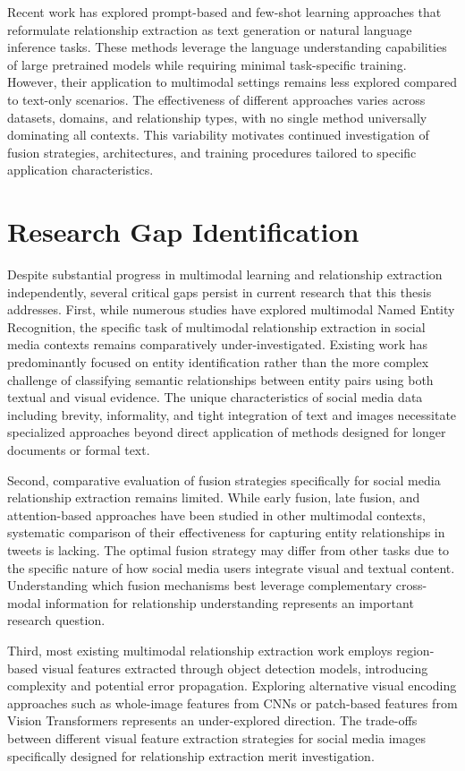 \documentclass[12pt,a4paper]{report}
\begin{document}
Recent work has explored prompt-based and few-shot learning approaches that reformulate relationship extraction as text generation or natural language inference tasks. These methods leverage the language understanding capabilities of large pretrained models while requiring minimal task-specific training. However, their application to multimodal settings remains less explored compared to text-only scenarios. The effectiveness of different approaches varies across datasets, domains, and relationship types, with no single method universally dominating all contexts. This variability motivates continued investigation of fusion strategies, architectures, and training procedures tailored to specific application characteristics.

\section{Research Gap Identification}

Despite substantial progress in multimodal learning and relationship extraction independently, several critical gaps persist in current research that this thesis addresses. First, while numerous studies have explored multimodal Named Entity Recognition, the specific task of multimodal relationship extraction in social media contexts remains comparatively under-investigated. Existing work has predominantly focused on entity identification rather than the more complex challenge of classifying semantic relationships between entity pairs using both textual and visual evidence. The unique characteristics of social media data including brevity, informality, and tight integration of text and images necessitate specialized approaches beyond direct application of methods designed for longer documents or formal text.

Second, comparative evaluation of fusion strategies specifically for social media relationship extraction remains limited. While early fusion, late fusion, and attention-based approaches have been studied in other multimodal contexts, systematic comparison of their effectiveness for capturing entity relationships in tweets is lacking. The optimal fusion strategy may differ from other tasks due to the specific nature of how social media users integrate visual and textual content. Understanding which fusion mechanisms best leverage complementary cross-modal information for relationship understanding represents an important research question.

Third, most existing multimodal relationship extraction work employs region-based visual features extracted through object detection models, introducing complexity and potential error propagation. Exploring alternative visual encoding approaches such as whole-image features from CNNs or patch-based features from Vision Transformers represents an under-explored direction. The trade-offs between different visual feature extraction strategies for social media images specifically designed for relationship extraction merit investigation.
\end{document}
